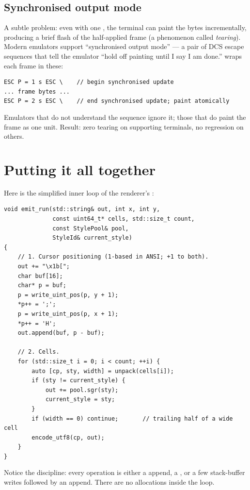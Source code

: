\subsection{Synchronised output mode}

A subtle problem: even with one , the terminal can paint
the bytes incrementally, producing a brief flash of the half-applied
frame (a phenomenon called \emph{tearing}). Modern emulators support
``synchronised output mode'' --- a pair of DCS escape sequences that
tell the emulator ``hold off painting until I say I am done.''
\maya{} wraps each frame in these:

\begin{lstlisting}
ESC P = 1 s ESC \    // begin synchronised update
... frame bytes ...
ESC P = 2 s ESC \    // end synchronised update; paint atomically
\end{lstlisting}

Emulators that do not understand the sequence ignore it; those that
do paint the frame as one unit. Result: zero tearing on supporting
terminals, no regression on others.

\section{Putting it all together}

Here is the simplified inner loop of the renderer's :

\begin{lstlisting}
void emit_run(std::string& out, int x, int y,
              const uint64_t* cells, std::size_t count,
              const StylePool& pool,
              StyleId& current_style)
{
    // 1. Cursor positioning (1-based in ANSI; +1 to both).
    out += "\x1b[";
    char buf[16];
    char* p = buf;
    p = write_uint_pos(p, y + 1);
    *p++ = ';';
    p = write_uint_pos(p, x + 1);
    *p++ = 'H';
    out.append(buf, p - buf);

    // 2. Cells.
    for (std::size_t i = 0; i < count; ++i) {
        auto [cp, sty, width] = unpack(cells[i]);
        if (sty != current_style) {
            out += pool.sgr(sty);
            current_style = sty;
        }
        if (width == 0) continue;       // trailing half of a wide cell
        encode_utf8(cp, out);
    }
}
\end{lstlisting}

Notice the discipline: every operation is either a 
append, a , or a few stack-buffer writes followed by an
append. There are no allocations inside the loop.

